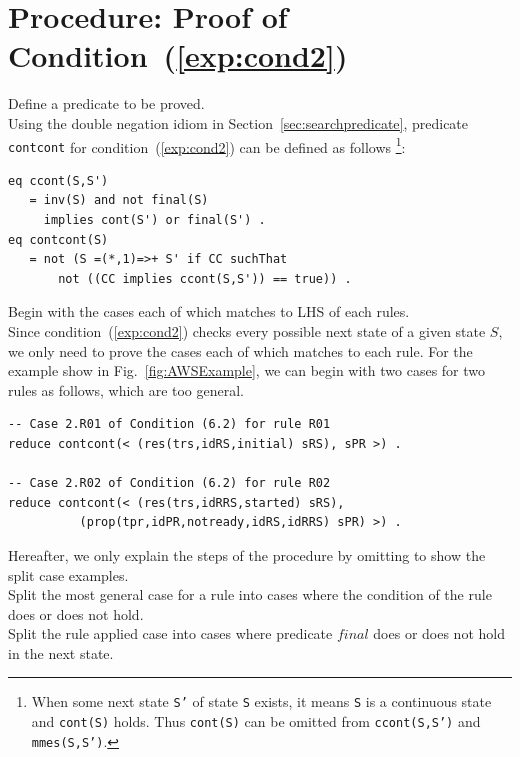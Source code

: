 \documentclass[12pt]{report}
\newcommand{\stt}[1]{{\small{\tt {#1}}}}
\begin{document}
\section{Procedure: Proof of Condition~(\ref{exp:cond2})}
\label{sec:contcont}
 Define a predicate to be proved. \\ Using the
double negation idiom in Section~\ref{sec:searchpredicate}, predicate
{\tt contcont} for condition~(\ref{exp:cond2}) can be defined as follows
\footnote{When some next state {\tt S'} of state {\tt S} exists, it
  means {\tt S} is a continuous state and \stt{cont(S)} holds. Thus
  \stt{cont(S)} can be omitted from \stt{ccont(S,S')} and
  \stt{mmes(S,S')}.}:
\begin{verbatim}
eq ccont(S,S')
   = inv(S) and not final(S) 
     implies cont(S') or final(S') .
eq contcont(S)
   = not (S =(*,1)=>+ S' if CC suchThat
       not ((CC implies ccont(S,S')) == true)) .
\end{verbatim}
 Begin with the cases each of which matches to
LHS of each rules. \\ Since condition~(\ref{exp:cond2}) checks every possible next
state of a given state $S$, we only need to prove the cases each of
which matches to each rule. For the example show in
Fig.~\ref{fig:AWSExample}, we can begin with two cases for two rules
as follows, which are too general.
\begin{verbatim}
-- Case 2.R01 of Condition (6.2) for rule R01
reduce contcont(< (res(trs,idRS,initial) sRS), sPR >) .

-- Case 2.R02 of Condition (6.2) for rule R02
reduce contcont(< (res(trs,idRRS,started) sRS), 
          (prop(tpr,idPR,notready,idRS,idRRS) sPR) >) .
\end{verbatim}

Hereafter, we only explain the steps of the procedure by omitting to show
the split case examples. \\

 Split the most general case for a rule into
cases where the condition of the rule does or does not hold. \\

 Split the rule applied case into cases
where predicate $final$ does or does not hold in the next state.\\
\end{document}
